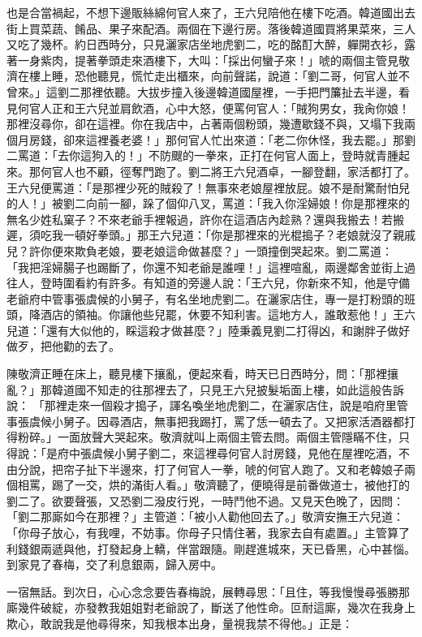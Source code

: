 也是合當禍起，不想下邊販絲綿何官人來了，王六兒陪他在樓下吃酒。韓道國出去街上買菜蔬、餚品、果子來配酒。兩個在下邊行房。落後韓道國買將果菜來，三人又吃了幾杯。約日西時分，只見灑家店坐地虎劉二，吃的酩酊大醉，軃開衣衫，露著一身紫肉，提著拳頭走來酒樓下，大叫：「採出何蠻子來！」唬的兩個主管見敬濟在樓上睡，恐他聽見，慌忙走出櫃來，向前聲諾，說道：「劉二哥，何官人並不曾來。」這劉二那裡依聽。大拔步撞入後邊韓道國屋裡，一手把門簾扯去半邊，看見何官人正和王六兒並肩飲酒，心中大怒，便罵何官人：「賊狗男女，我肏你娘！那裡沒尋你，卻在這裡。你在我店中，占著兩個粉頭，幾遭歇錢不與，又塌下我兩個月房錢，卻來這裡養老婆！」那何官人忙出來道：「老二你休怪，我去罷。」那劉二罵道：「去你這狗入的！」不防颼的一拳來，正打在何官人面上，登時就青腫起來。那何官人也不顧，徑奪門跑了。劉二將王六兒酒卓，一腳登翻，家活都打了。王六兒便罵道：「是那裡少死的賊殺了！無事來老娘屋裡放屁。娘不是耐驚耐怕兒的人！」被劉二向前一腳，跺了個仰八叉，罵道：「我入你淫婦娘！你是那裡來的無名少姓私窠子？不來老爺手裡報過，許你在這酒店內趁熟？還與我搬去！若搬遲，須吃我一頓好拳頭。」那王六兒道：「你是那裡來的光棍搗子？老娘就沒了親戚兒？許你便來欺負老娘，要老娘這命做甚麼？」一頭撞倒哭起來。劉二罵道： 「我把淫婦腸子也踢斷了，你還不知老爺是誰哩！」這裡喧亂，兩邊鄰舍並街上過往人，登時圍看約有許多。有知道的旁邊人說：「王六兒，你新來不知，他是守備老爺府中管事張虞候的小舅子，有名坐地虎劉二。在灑家店住，專一是打粉頭的班頭，降酒店的領袖。你讓他些兒罷，休要不知利害。這地方人，誰敢惹他！」王六兒道：「還有大似他的，睬這殺才做甚麼？」陸秉義見劉二打得凶，和謝胖子做好做歹，把他勸的去了。

陳敬濟正睡在床上，聽見樓下攘亂，便起來看，時天已日西時分，問：「那裡攘亂？」那韓道國不知走的往那裡去了，只見王六兒披髮垢面上樓，如此這般告訴說： 「那裡走來一個殺才搗子，諢名喚坐地虎劉二，在灑家店住，說是咱府里管事張虞候小舅子。因尋酒店，無事把我踢打，罵了恁一頓去了。又把家活酒器都打得粉碎。」一面放聲大哭起來。敬濟就叫上兩個主管去問。兩個主管隱瞞不住，只得說：「是府中張虞候小舅子劉二，來這裡尋何官人討房錢，見他在屋裡吃酒，不由分說，把帘子扯下半邊來，打了何官人一拳，唬的何官人跑了。又和老韓娘子兩個相罵，踢了一交，烘的滿街人看。」敬濟聽了，便曉得是前番做道士，被他打的劉二了。欲要聲張，又恐劉二潑皮行兇，一時鬥他不過。又見天色晚了，因問：「劉二那廝如今在那裡？」主管道：「被小人勸他回去了。」敬濟安撫王六兒道：「你母子放心，有我哩，不妨事。你母子只情住著，我家去自有處置。」主管算了利錢銀兩遞與他，打發起身上轎，伴當跟隨。剛趕進城來，天已昏黑，心中甚惱。到家見了春梅，交了利息銀兩，歸入房中。

一宿無話。到次日，心心念念要告春梅說，展轉尋思：「且住，等我慢慢尋張勝那廝幾件破綻，亦發教我姐姐對老爺說了，斷送了他性命。叵耐這廝，幾次在我身上欺心，敢說我是他尋得來，知我根本出身，量視我禁不得他。」正是：

